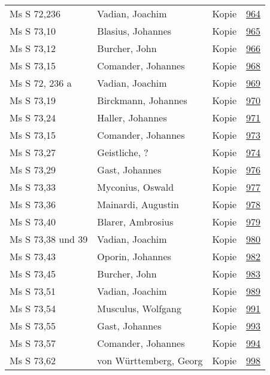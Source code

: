 \documentclass[10pt,a4paper,landscape]{report}
\begin{document}
\begin{longtable}{p{16cm}p{4cm}lr}
Ms S 72,236	&	Vadian, Joachim	&	Kopie	&	\href{http://130.60.24.72/assignment/964}{964}\\
Ms S 73,10	&	Blasius, Johannes	&	Kopie	&	\href{http://130.60.24.72/assignment/965}{965}\\
Ms S 73,12	&	Burcher, John	&	Kopie	&	\href{http://130.60.24.72/assignment/966}{966}\\
Ms S 73,15	&	Comander, Johannes	&	Kopie	&	\href{http://130.60.24.72/assignment/968}{968}\\
Ms S 72, 236 a	&	Vadian, Joachim	&	Kopie	&	\href{http://130.60.24.72/assignment/969}{969}\\
Ms S 73,19	&	Birckmann, Johannes	&	Kopie	&	\href{http://130.60.24.72/assignment/970}{970}\\
Ms S 73,24	&	Haller, Johannes	&	Kopie	&	\href{http://130.60.24.72/assignment/971}{971}\\
Ms S 73,15	&	Comander, Johannes	&	Kopie	&	\href{http://130.60.24.72/assignment/973}{973}\\
Ms S 73,27	&	Geistliche, ?	&	Kopie	&	\href{http://130.60.24.72/assignment/974}{974}\\
Ms S 73,29	&	Gast, Johannes	&	Kopie	&	\href{http://130.60.24.72/assignment/976}{976}\\
Ms S 73,33	&	Myconius, Oswald	&	Kopie	&	\href{http://130.60.24.72/assignment/977}{977}\\
Ms S 73,36	&	Mainardi, Augustin	&	Kopie	&	\href{http://130.60.24.72/assignment/978}{978}\\
Ms S 73,40	&	Blarer, Ambrosius	&	Kopie	&	\href{http://130.60.24.72/assignment/979}{979}\\
Ms S 73,38 und 39	&	Vadian, Joachim	&	Kopie	&	\href{http://130.60.24.72/assignment/980}{980}\\
Ms S 73,43	&	Oporin, Johannes	&	Kopie	&	\href{http://130.60.24.72/assignment/982}{982}\\
Ms S 73,45	&	Burcher, John	&	Kopie	&	\href{http://130.60.24.72/assignment/983}{983}\\
Ms S 73,51	&	Vadian, Joachim	&	Kopie	&	\href{http://130.60.24.72/assignment/989}{989}\\
Ms S 73,54	&	Musculus, Wolfgang	&	Kopie	&	\href{http://130.60.24.72/assignment/991}{991}\\
Ms S 73,55	&	Gast, Johannes	&	Kopie	&	\href{http://130.60.24.72/assignment/993}{993}\\
Ms S 73,57	&	Comander, Johannes	&	Kopie	&	\href{http://130.60.24.72/assignment/994}{994}\\
Ms S 73,62	&	von Württemberg, Georg	&	Kopie	&	\href{http://130.60.24.72/assignment/998}{998}\\

\end{longtable}
\end{document}
